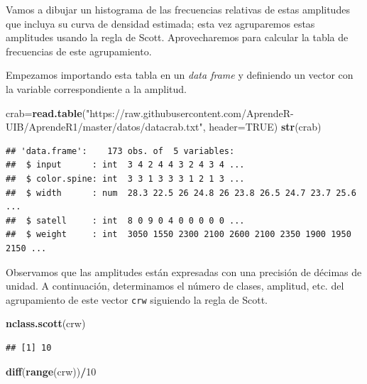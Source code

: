 \documentclass[]{book}
\newenvironment{Shaded}{\begin{snugshade}}{\end{snugshade}}
\newcommand{\DataTypeTok}[1]{\textcolor[rgb]{0.13,0.29,0.53}{#1}}
\newcommand{\DecValTok}[1]{\textcolor[rgb]{0.00,0.00,0.81}{#1}}
\newcommand{\KeywordTok}[1]{\textcolor[rgb]{0.13,0.29,0.53}{\textbf{#1}}}
\newcommand{\NormalTok}[1]{#1}
\newcommand{\OperatorTok}[1]{\textcolor[rgb]{0.81,0.36,0.00}{\textbf{#1}}}
\newcommand{\OtherTok}[1]{\textcolor[rgb]{0.56,0.35,0.01}{#1}}
\newcommand{\StringTok}[1]{\textcolor[rgb]{0.31,0.60,0.02}{#1}}
\theoremstyle{definition}
\theoremstyle{definition}
\theoremstyle{definition}
\theoremstyle{remark}
\begin{document}
Vamos a dibujar un histograma de las frecuencias relativas de estas amplitudes que incluya su curva de densidad estimada; esta vez agruparemos estas amplitudes usando la regla de Scott. Aprovecharemos para calcular la tabla de frecuencias de este agrupamiento.

Empezamos importando esta tabla en un \emph{data frame} y definiendo un vector con la variable correspondiente a la amplitud.

\begin{Shaded}
\begin{Highlighting}[]
\NormalTok{crab=}\KeywordTok{read.table}\NormalTok{(}\StringTok{"https://raw.githubusercontent.com/AprendeR-UIB/AprendeR1/master/datos/datacrab.txt"}\NormalTok{, }\DataTypeTok{header=}\OtherTok{TRUE}\NormalTok{)}
\KeywordTok{str}\NormalTok{(crab)}
\end{Highlighting}
\end{Shaded}

\begin{verbatim}
## 'data.frame':    173 obs. of  5 variables:
##  $ input      : int  3 4 2 4 4 3 2 4 3 4 ...
##  $ color.spine: int  3 3 1 3 3 3 1 2 1 3 ...
##  $ width      : num  28.3 22.5 26 24.8 26 23.8 26.5 24.7 23.7 25.6 ...
##  $ satell     : int  8 0 9 0 4 0 0 0 0 0 ...
##  $ weight     : int  3050 1550 2300 2100 2600 2100 2350 1900 1950 2150 ...
\end{verbatim}

\begin{Shaded}
\end{Shaded}

Observamos que las amplitudes están expresadas con una precisión de décimas de unidad.
A continuación, determinamos el número de clases, amplitud, etc. del agrupamiento de este vector \texttt{crw} siguiendo la regla de Scott.

\begin{Shaded}
\begin{Highlighting}[]
\KeywordTok{nclass.scott}\NormalTok{(crw)}
\end{Highlighting}
\end{Shaded}

\begin{verbatim}
## [1] 10
\end{verbatim}

\begin{Shaded}
\begin{Highlighting}[]
\KeywordTok{diff}\NormalTok{(}\KeywordTok{range}\NormalTok{(crw))}\OperatorTok{/}\DecValTok{10}
\end{Highlighting}
\end{Shaded}
\end{document}
